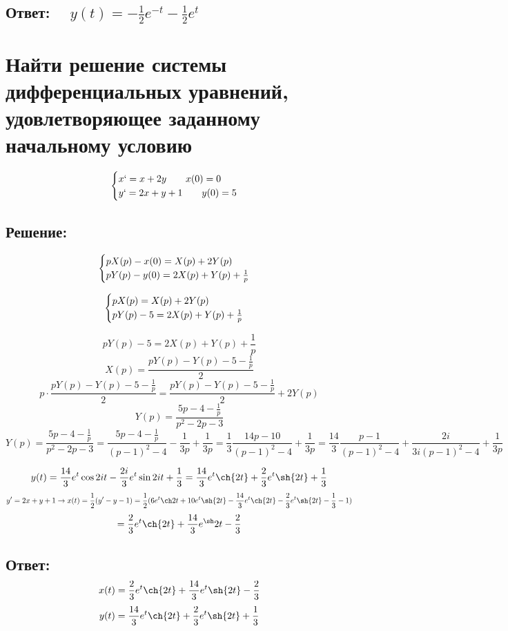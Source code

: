 \documentclass{article}
\begin{document}
	\subsection{Ответ: $\quad y(t) = -\frac{1}{2}e^{-t}- \frac{1}{2}e^{t}$}

	\vspace{1cm}
	\section{Найти решение системы дифференциальных уравнений, удовлетворяющее заданному
	начальному условию }
	\[
		\begin{cases}x` = x + 2y \quad\quad x(0) = 0\\ y` = 2x + y + 1 \quad\quad y(0
		) = 5 \end{cases}
	\]
	\subsection{Решение:}
	\[
		\begin{cases}
			pX(p) - x(0) = X(p) + 2Y(p)               \\
			pY(p) - y(0) = 2X(p) + Y(p) + \frac{1}{p}
		\end{cases}
		\vspace{0.5cm}
	\]

	\vspace{0.3cm}
	\[
		\begin{cases}
			pX(p) = X(p) + 2Y(p)                   \\
			pY(p) - 5 = 2X(p) + Y(p) + \frac{1}{p}
		\end{cases}
		\vspace{0.4cm}
	\]

	\[
		pY(p) - 5 = 2X(p) + Y(p) + \frac{1}{p}
	\]
	\[
		X(p) = \frac{pY(p) - Y(p) - 5 - \frac{1}{p}}{2}
	\]
	\[
		p \cdot\frac{pY(p) - Y(p) - 5 - \frac{1}{p}}{2}= \frac{pY(p)- Y(p) - 5 -
		\frac{1}{p}}{2}+ 2Y(p)
	\]
	\[
		Y(p) = \frac{5p-4-\frac{1}{p}}{p^{2} - 2p - 3}
	\]
	\[
		Y(p) = \frac{5p-4-\frac{1}{p}}{p^{2} - 2p - 3}= \frac{5p-4-\frac{1}{p}}{(p-1)^{2}
		- 4}- \frac{1}{3p}+ \frac{1}{3p}= \frac{1}{3}\frac{14p - 10}{(p-1)^{2} - 4}+
		\frac{1}{3p}= \frac{14}{3}\frac{p-1}{(p-1)^{2} - 4}+ \frac{2i}{3i(p-1)^{2} -
		4}+ \frac{1}{3p}
	\]

	\[
		y(t) = \frac{14}{3}e^{t} \cos{2it}- \frac{2i}{3}e^{t} \sin{2it}+ \frac{1}{3}=
		\frac{14}{3}e^{t}\ch{2t}+ \frac{2}{3}e^{t}\sh{2t}+ \frac{1}{3}
	\]
	\[
		y' = 2x + y + 1 \rightarrow x(t) = \frac{1}{2}(y' - y - 1) = \frac{1}{2}(6e^{t}
		\ch2t + 10e^{t}\sh{2t}- \frac{14}{3}e^{t}\ch{2t}- \frac{2}{3}e^{t}\sh{2t}-\frac{1}{3}
		- 1)
	\]
	\[
		= \frac{2}{3}e^{t}\ch{2t}+ \frac{14}{3}e^{\sh}{2t}- \frac{2}{3}
	\]

	\subsection{Ответ:
	\[
		x(t) = \frac{2}{3}e^{t}\ch{2t}+ \frac{14}{3}e^{t}\sh{2t}- \frac{2}{3}
	\]
	\[
		y(t) = \frac{14}{3}e^{t}\ch{2t}+ \frac{2}{3}e^{t}\sh{2t}+ \frac{1}{3}
	\]
	}
\end{document}
